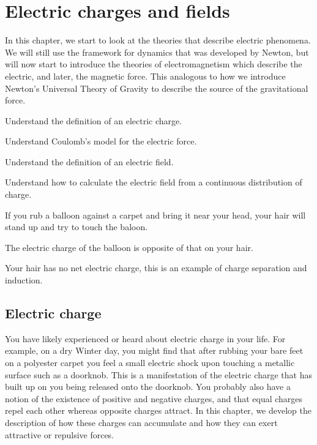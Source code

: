 
\chapter{Electric charges and fields}
\label{chapter:chargesfields}
In this chapter, we start to look at the theories that describe electric phenomena. We will still use the framework for dynamics that was developed by Newton, but will now start to introduce the theories of electromagnetism which describe the electric, and later, the magnetic force. This analogous to how we introduce Newton's Universal Theory of Gravity to describe the source of the gravitational force. 


\begin{learningObjectives}{
 \item Understand the definition of an electric charge.
 \item Understand Coulomb's model for the electric force.
 \item Understand the definition of an electric field.
 \item Understand how to calculate the electric field from a continuous distribution of charge.
 }
\end{learningObjectives}

\begin{opening}
\begin{MCquestion}{If you rub a balloon against a carpet and bring it near your head, your hair will stand up and try to touch the baloon.}
\item The electric charge of the balloon is opposite of that on your hair.
\item Your hair has no net electric charge, this is an example of charge separation and induction. \correct
\end{MCquestion}
\end{opening}

\section{Electric charge}
You have likely experienced or heard about electric charge in your life. For example, on a dry Winter day, you might find that after rubbing your bare feet on a polyester carpet you feel a small electric shock upon touching a metallic surface such as a doorknob. This is a manifestation of the electric charge that has built up on you being released onto the doorknob. You probably also have a notion of the existence of positive and negative charges, and that equal charges repel each other whereas opposite charges attract. In this chapter, we develop the description of how these charges can accumulate and how they can exert attractive or repulsive forces. 

